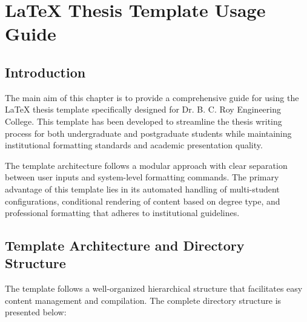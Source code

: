 
\chapter{LaTeX Thesis Template Usage Guide}
\label{ch:template_guide}
\justifying

\section{Introduction}
\label{sec:intro}

The main aim of this chapter is to provide a comprehensive guide for using the LaTeX thesis template specifically designed for Dr. B. C. Roy Engineering College. This template has been developed to streamline the thesis writing process for both undergraduate and postgraduate students while maintaining institutional formatting standards and academic presentation quality.

The template architecture follows a modular approach with clear separation between user inputs and system-level formatting commands. The primary advantage of this template lies in its automated handling of multi-student configurations, conditional rendering of content based on degree type, and professional formatting that adheres to institutional guidelines.

\section{Template Architecture and Directory Structure}
\label{sec:architecture}

The template follows a well-organized hierarchical structure that facilitates easy content management and compilation. The complete directory structure is presented below:

